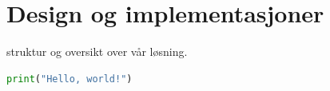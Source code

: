 \section{Design og implementasjoner}

struktur og oversikt over vår løsning.

\begin{lstlisting}[language=Python, caption={Example script}, label={lst:example}]
print("Hello, world!")
\end{lstlisting}